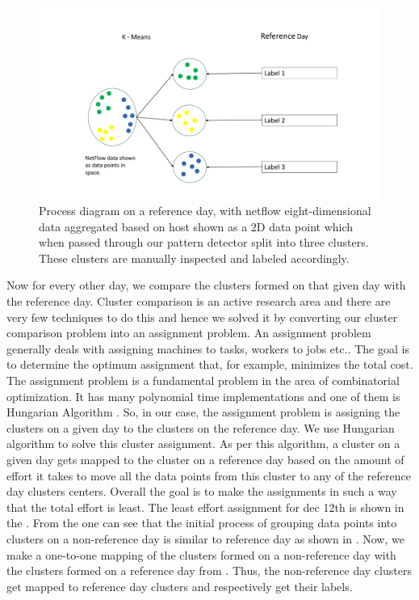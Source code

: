 \begin{figure}[b]
	\centerline{\includegraphics[scale = 0.5]{cluster_comp.pdf}}
	\caption{Process diagram on a reference day, with netflow eight-dimensional data aggregated based on host shown as a 2D data point which when passed through our pattern detector split into three clusters. These clusters are manually inspected and labeled accordingly. }%
\end{figure}

 Now for every other day, we compare the clusters formed on that given day with the reference day. Cluster comparison is an active research area and there are very few techniques to do this and hence we solved it by converting our cluster comparison problem into an assignment problem. An assignment problem generally deals with assigning machines to tasks, workers to jobs etc.. The goal is to determine the optimum assignment that, for example, minimizes the total cost. The assignment problem is a fundamental problem in the area of combinatorial optimization. It has many polynomial time implementations and one of them is Hungarian Algorithm \cite{kuhn1955hungarian}. So, in our case, the assignment problem is assigning the clusters on a given day to the clusters on the reference day. We use Hungarian algorithm to solve this cluster assignment. As per this algorithm, a cluster on a given day gets mapped to the cluster on a reference day based on the amount of effort it takes to move all the data points from this cluster to any of the reference day clusters centers. Overall the goal is to make the assignments in such a way that the total effort is least. The least effort assignment for dec 12th is shown in the . From the   one can see that the initial process of grouping data points into clusters on a non-reference day is similar to reference day as shown in . Now, we make a one-to-one mapping of the clusters formed on a non-reference day with the clusters formed on a reference day from . Thus, the non-reference day clusters get mapped to reference day clusters and respectively get their labels.
 


